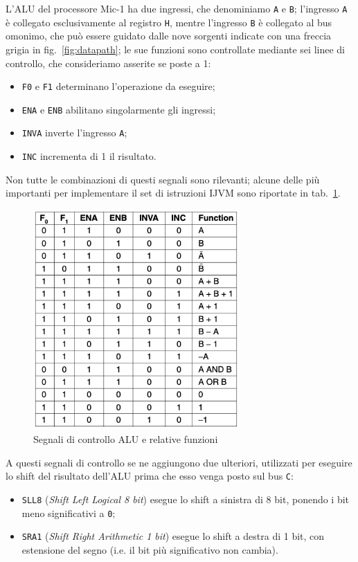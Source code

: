 \documentclass[a4paper,12pt]{scrreprt}
\begin{document}
L'ALU del processore Mic-1 ha due ingressi, che denominiamo \lstinline{A} e
\lstinline{B}; l'ingresso \lstinline{A} è collegato esclusivamente al registro
\lstinline{H}, mentre l'ingresso \lstinline{B} è collegato al bus
omonimo, che può essere guidato dalle nove sorgenti indicate con una freccia
grigia in fig.~\ref{fig:datapath}; le sue funzioni sono controllate mediante sei
linee di controllo, che consideriamo asserite se poste a 1:
\begin{itemize}
  \item \lstinline{F0} e \lstinline{F1} determinano l'operazione da eseguire;
  \item \lstinline{ENA} e \lstinline{ENB} abilitano singolarmente gli ingressi;
  \item \lstinline{INVA} inverte l'ingresso \lstinline{A};
  \item \lstinline{INC} incrementa di 1 il risultato.
\end{itemize}

Non tutte le combinazioni di questi segnali sono rilevanti; alcune delle più
importanti per implementare il set di istruzioni IJVM sono riportate in
tab.~\ref{fig:alu_func}.

\begin{figure}
  \centering
  \includegraphics[width=0.7\textwidth]{alu_func.png}
  \caption{Segnali di controllo ALU e relative funzioni}\label{fig:alu_func}
\end{figure}

A questi segnali di controllo se ne aggiungono due ulteriori, utilizzati per
eseguire lo shift del risultato dell'ALU prima che esso venga posto sul bus
\lstinline{C}:
\begin{itemize}
  \item \lstinline{SLL8} (\textit{Shift Left Logical 8 bit}) esegue lo shift a
  sinistra di 8 bit, ponendo i bit meno significativi a \lstinline{0};
  \item \lstinline{SRA1} (\textit{Shift Right Arithmetic 1 bit}) esegue lo shift
  a destra di 1 bit, con estensione del segno (i.e. il bit più significativo non
  cambia).
\end{itemize}
\end{document}
